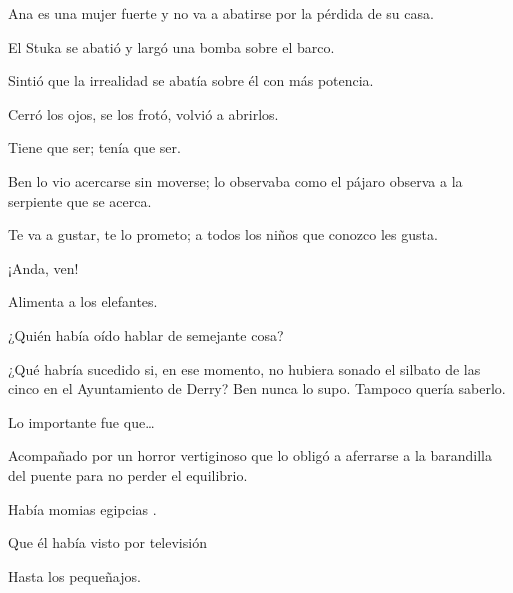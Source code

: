 \sk
Ana es una mujer fuerte y no va a abatirse por la pérdida de su casa.

\sk
El Stuka se abatió y largó una bomba sobre el barco.

\sk
Sintió que la irrealidad se abatía sobre él con más potencia.

\sk
Cerró los ojos, se los frotó, volvió a abrirlos.

\sk
Tiene que ser; tenía que ser.

\sk
Ben lo vio acercarse sin moverse; lo observaba como el
pájaro observa a la serpiente que se acerca.

\sk
Te va a gustar, te lo prometo; a todos los niños que
conozco les gusta.

\sk
\nb{}

\sk
¡Anda, ven!

\sk
Alimenta a los elefantes.

\sk
¿Quién había oído hablar de semejante cosa?

\sk
¿Qué habría sucedido si, en ese momento, no
hubiera sonado el silbato de las cinco en el
Ayuntamiento de Derry? Ben nunca lo supo.
Tampoco quería saberlo.

\sk
Lo importante fue que\ldots{}

\sk
Acompañado por un horror
vertiginoso que lo obligó a aferrarse a la barandilla
del puente para no perder el equilibrio.

\sk
Había momias egipcias .

\sk
Que él había visto por televisión

\sk
Hasta los pequeñajos.

